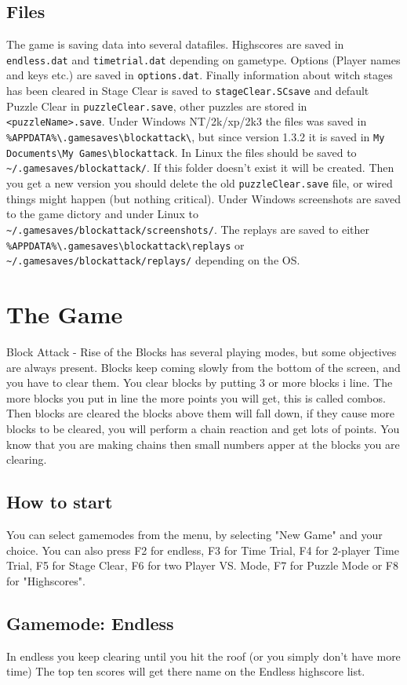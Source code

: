\documentclass[11pt,a4paper]{article}
\begin{document}
\subsection{Files}
The game is saving data into several datafiles. Highscores are
saved in \verb+endless.dat+ and \verb+timetrial.dat+ depending on
gametype. Options (Player names and keys etc.) are saved in
\verb+options.dat+. Finally information about witch stages has
been cleared in Stage Clear is saved to \verb+stageClear.SCsave+ and
default Puzzle Clear in \verb+puzzleClear.save+, other puzzles are stored in \verb+<puzzleName>.save+. Under Windows NT/2k/xp/2k3 the files was saved in \verb+%APPDATA%\.gamesaves\blockattack\+, but since version 1.3.2 it is saved in \verb+My Documents\My Games\blockattack+. In Linux the files should
be saved to \verb+~/.gamesaves/blockattack/+. If this folder
doesn't exist it will be created. Then you get a new version you
should delete the old \verb+puzzleClear.save+ file, or  wired
things might happen (but nothing critical). Under Windows screenshots are saved to the game dictory and under Linux to \newline \verb+~/.gamesaves/blockattack/screenshots/+. The replays are saved to either \verb+%APPDATA%\.gamesaves\blockattack\replays+ or \\ \verb+~/.gamesaves/blockattack/replays/+ depending on the OS.
\section{The Game}
Block Attack - Rise of the Blocks has several playing modes, but
some objectives are always present. Blocks keep coming slowly from
the bottom of the screen, and you have to clear them. You clear
blocks by putting 3 or more blocks i line. The more blocks you put
in line the more points you will get, this is called combos. Then
blocks are cleared the blocks above them will fall down, if they
cause more blocks to be cleared, you will perform a chain reaction
and get lots of points. You know that you are making chains then small numbers apper at the blocks you are clearing.
\subsection{How to start}
You can select gamemodes from the menu, by selecting "New Game"
and your choice. You can also press F2 for endless, F3 for Time
Trial, F4 for 2-player Time Trial, F5 for Stage Clear, F6 for two
Player VS. Mode, F7 for Puzzle Mode or F8 for "Highscores".
\subsection{Gamemode: Endless}
In endless you keep clearing until you hit the roof (or you simply
don't have more time) The top ten scores will get there name on
the Endless highscore list.
\end{document}

